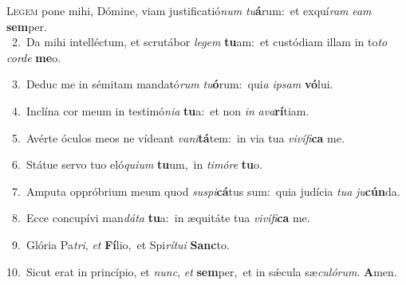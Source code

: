 \lettrine{\initial\textcolor{\initialcolor}{L}}{egem} pone mihi, Dómine, viam justificatió\textit{num} \textit{tu}\-\textbf{á}rum:~\star et exquí\textit{ram} \textit{e}\-\textit{am} \textbf{sem}\-per.\\
{\numbfont\textcolor{\numbcolor}{~2.}}~Da mihi intelléctum, et scrutábor \textit{le}\-\textit{gem} \textbf{tu}\-am:~\star et custódiam illam in to\textit{to} \textit{cor}\-\textit{de} \textbf{me}\-o.\par
{\numbfont\textcolor{\numbcolor}{~3.}}~Deduc me in sémitam mandató\textit{rum} \textit{tu}\-\textbf{ó}rum:~\star qui\textit{a} \textit{ip}\-\textit{sam} \textbf{vó}\-lui.\par
{\numbfont\textcolor{\numbcolor}{~4.}}~Inclína cor meum in testimó\-\textit{ni}\-\textit{a} \textbf{tu}\-a:~\star et non \textit{in} \textit{a}\-\textit{va}\textbf{rí}tiam.\par
{\numbfont\textcolor{\numbcolor}{~5.}}~Avérte óculos meos ne vídeant \textit{va}\-\textit{ni}\textbf{tá}tem:~\star in via tua \textit{vi}\-\textit{ví}\textit{fi}\textbf{ca} me.\par
{\numbfont\textcolor{\numbcolor}{~6.}}~Státue servo tuo eló\-\textit{qui}\-\textit{um} \textbf{tu}\-um,~\star in \textit{ti}\-\textit{mó}\textit{re} \textbf{tu}\-o.\par
{\numbfont\textcolor{\numbcolor}{~7.}}~Amputa oppróbrium meum quod \textit{su}\-\textit{spi}\textbf{cá}tus sum:~\star quia judícia \textit{tu}\-\textit{a} \textit{ju}\-\textbf{cún}da.\par
{\numbfont\textcolor{\numbcolor}{~8.}}~Ecce concupívi man\-\textit{dá}\-\textit{ta} \textbf{tu}\-a:~\star in æquitáte tua \textit{vi}\-\textit{ví}\textit{fi}\textbf{ca} me.\par
{\numbfont\textcolor{\numbcolor}{~9.}}~Glória Pa\-\textit{tri}\-, \textit{et} \textbf{Fí}\-lio,~\star et Spi\-\textit{rí}\-\textit{tu}\textit{i} \textbf{Sanc}\-to.\par
{\numbfont\textcolor{\numbcolor}{10.}}~Sicut erat in princípio, et \textit{nunc}\-, \textit{et} \textbf{sem}\-per,~\star et in sǽcula sæ\-\textit{cu}\-\textit{ló}\textit{rum}. \textbf{A}\-men.\par
